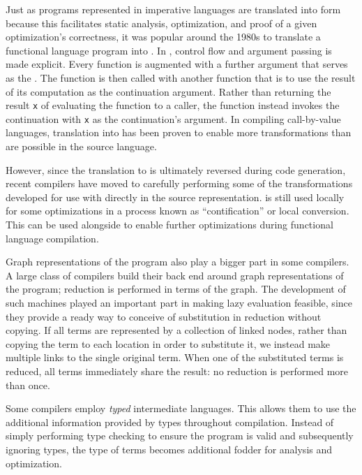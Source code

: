 Just as programs represented in imperative languages are translated into \SSA form because this facilitates static analysis, optimization, and proof of a given optimization's correctness, it was popular around the 1980s to translate a functional language program into . In \CPS{}, control flow and argument passing is made explicit. Every function is augmented with a further argument that serves as the . The function is then called with another function that is to use the result of its computation as the continuation argument. Rather than returning the result \lstinline{x} of evaluating the function to a caller, the function instead invokes the continuation with \lstinline{x} as the continuation's argument. In compiling call-by-value languages, translation into \CPS has been proven to enable more transformations than are possible in the source language.

However, since the translation to \CPS is ultimately reversed during code generation, recent compilers have moved to carefully performing some of the transformations developed for use with \CPS directly in the source representation. \CPS is still used locally for some optimizations in a process known as ``contification'' or local \CPS conversion. This can be used alongside \SSA to enable further optimizations during functional language compilation.

Graph representations of the program also play a bigger part in some compilers. A large class of compilers build their back end around graph representations of the program; reduction is performed in terms of the graph. The development of such  machines played an important part in making lazy evaluation feasible, since they provide a ready way to conceive of substitution in reduction without copying. If all terms are represented by a collection of linked nodes, rather than copying the term to each location in order to substitute it, we instead make multiple links to the single original term. When one of the substituted terms is reduced, all terms immediately share the result: no reduction is performed more than once.

Some compilers employ \emph{typed} intermediate languages. This allows them to use the additional information provided by types throughout compilation. Instead of simply performing type checking to ensure the program is valid and subsequently ignoring types, the type of terms becomes additional fodder for analysis and optimization.

